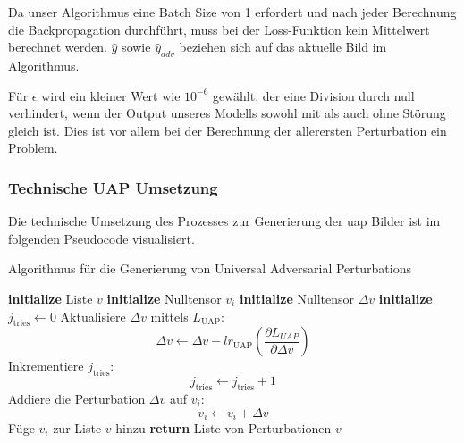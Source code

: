 Da unser Algorithmus eine Batch Size von 1 erfordert und nach jeder Berechnung die Backpropagation durchführt, muss bei der Loss-Funktion kein Mittelwert berechnet werden. $\hat{y}$ sowie $\hat{y}_{adv}$ beziehen sich auf das aktuelle Bild im Algorithmus.

Für $\epsilon$ wird ein kleiner Wert wie $10^{-6}$ gewählt, der eine Division durch null verhindert, wenn der Output unseres Modells sowohl mit als auch ohne Störung gleich ist. Dies ist vor allem bei der Berechnung der allerersten Perturbation ein Problem.

\newpage
\subsubsection{Technische UAP Umsetzung}

Die technische Umsetzung des Prozesses zur Generierung der \acrshort{uap} Bilder ist im folgenden Pseudocode visualisiert.

\begin{algorithm}[H]
\caption{Algorithmus für die Generierung von Universal Adversarial Perturbations}
\begin{algorithmic}[1]
\label{algo:UAP Algorithmus}
\STATE \textbf{initialize} Liste $v$
    \STATE \textbf{initialize} Nulltensor $v_i$
        \STATE \textbf{initialize} Nulltensor $\Delta v$
        \STATE \textbf{initialize} $j_{\text{tries}} \gets 0$
            \STATE Aktualisiere $\Delta v$ mittels $L_{\text{UAP}}$: $$\Delta v \gets \Delta v - lr_{\text{UAP}} (\frac{\partial L_{UAP}}{\partial \Delta v})$$
            \STATE Inkrementiere $j_{\text{tries}}$: $$j_{\text{tries}} \gets j_{\text{tries}} + 1$$
            \ENDWHILE
            \STATE Addiere die Perturbation $\Delta v$ auf $v_i$: $$v_i \leftarrow v_i + \Delta v$$
        \ENDFOR
    \ENDWHILE
    \STATE Füge $v_i$ zur Liste $v$ hinzu
\ENDFOR
\STATE \textbf{return} Liste von Perturbationen $v$
\end{algorithmic}
\end{algorithm}

